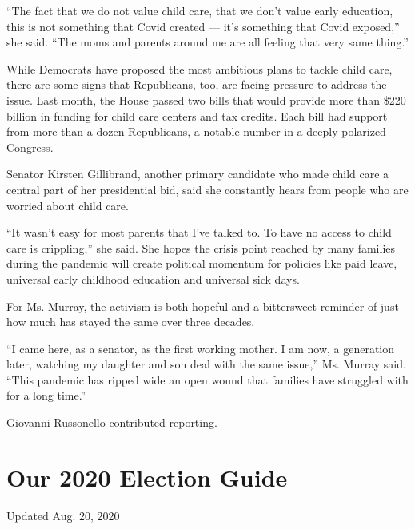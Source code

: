 ``The fact that we do not value child care, that we don't value early
education, this is not something that Covid created --- it's something
that Covid exposed,'' she said. ``The moms and parents around me are all
feeling that very same thing.''

While Democrats have proposed the most ambitious plans to tackle child
care, there are some signs that Republicans, too, are facing pressure to
address the issue. Last month, the House passed two bills that would
provide more than \$220 billion in funding for child care centers and
tax credits. Each bill had support from more than a dozen Republicans, a
notable number in a deeply polarized Congress.

Senator Kirsten Gillibrand, another primary candidate who made child
care a central part of her presidential bid, said she constantly hears
from people who are worried about child care.

``It wasn't easy for most parents that I've talked to. To have no access
to child care is crippling,'' she said. She hopes the crisis point
reached by many families during the pandemic will create political
momentum for policies like paid leave, universal early childhood
education and universal sick days.

For Ms. Murray, the activism is both hopeful and a bittersweet reminder
of just how much has stayed the same over three decades.

``I came here, as a senator, as the first working mother. I am now, a
generation later, watching my daughter and son deal with the same
issue,'' Ms. Murray said. ``This pandemic has ripped wide an open wound
that families have struggled with for a long time.''

Giovanni Russonello contributed reporting.

\hypertarget{our-2020-election-guide}{%
\section{Our 2020 Election Guide}\label{our-2020-election-guide}}

Updated Aug. 20, 2020

